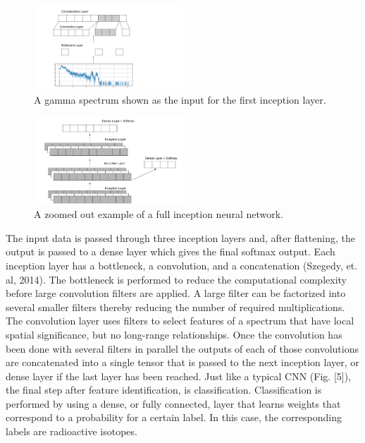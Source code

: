 \documentclass{anstrans}
\begin{document}
\begin{figure}[h]
    \centering
    \includegraphics[width=0.5\textwidth]{inn-layer_figure.png}
    \caption{A gamma spectrum shown as the input for the first inception layer.}
    \label{fig:inn-layer}
\end{figure}
\begin{figure}[h]
    \centering
    \includegraphics[width=0.5\textwidth]{inn-full-figure.png}
    \caption{A zoomed out example of a full inception neural network.}
    \label{fig:inn-full}
\end{figure}

The input data is passed through three inception layers and, after flattening, the output is passed to a dense layer which gives the final softmax output. 
Each inception layer has a bottleneck, a convolution, and a concatenation (Szegedy, et. al, 2014).
The bottleneck is performed to reduce the computational complexity before large convolution filters are applied. 
A large filter can be factorized into several smaller filters thereby reducing the number of required multiplications. 
The convolution layer uses filters to select features of a spectrum that have local spatial significance, but no long-range relationships. 
Once the convolution has been done with several filters in parallel the outputs of each of those convolutions are concatenated into a single tensor that is passed to the next inception layer, or dense layer if the last layer has been reached. 
Just like a typical CNN (Fig. [5]), the final step after feature identification, is classification. 
Classification is performed by using a dense, or fully connected, layer that learns weights that correspond to a probability for a certain label. 
In this case, the corresponding labels are radioactive isotopes.
\end{document}
